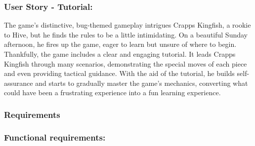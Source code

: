 \documentclass[
]{article}
\begin{document}
\hypertarget{user-story---tutorial}{%
\subsubsection{User Story - Tutorial:}\label{user-story---tutorial}}

The game's distinctive, bug-themed gameplay intrigues Crapps Kingfish, a
rookie to Hive, but he finds the rules to be a little intimidating. On a
beautiful Sunday afternoon, he fires up the game, eager to learn but
unsure of where to begin. Thankfully, the game includes a clear and
engaging tutorial. It leads Crapps Kingfish through many scenarios,
demonstrating the special moves of each piece and even providing
tactical guidance. With the aid of the tutorial, he builds
self-assurance and starts to gradually master the game's mechanics,
converting what could have been a frustrating experience into a fun
learning experience.

\newpage

\hypertarget{requirements}{%
\subsubsection{Requirements}\label{requirements}}

\hypertarget{functional-requirements}{%
\subsubsection{Functional requirements:}\label{functional-requirements}}
\end{document}
